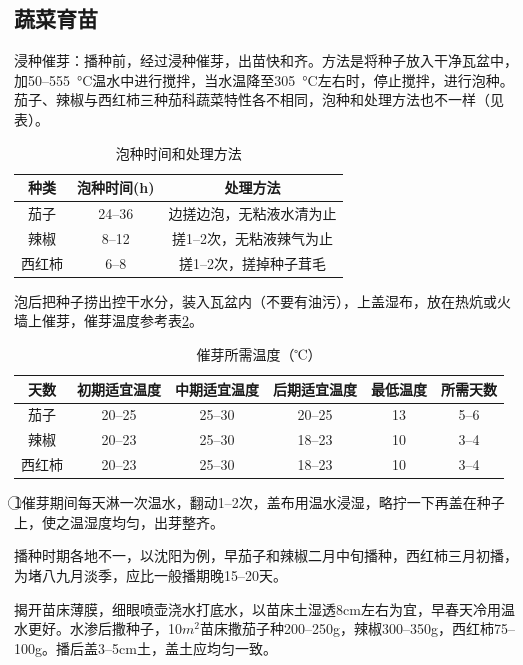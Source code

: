 \documentclass{ctexbook}
\begin{document}
\subsection{蔬菜育苗}
浸种催芽：播种前，经过浸种催芽，出苗快和齐。方法是将种子放入干净瓦盆中，加50--55\SI{5}{\degreeCelsius}温水中进行搅拌，当水温降至30\SI{5}{\degreeCelsius}左右时，停止搅拌，进行泡种。茄子、辣椒与西红柿三种茄科蔬菜特性各不相同，泡种和处理方法也不一样（见表）。
\begin{table}[htbp]
  \centering
  \caption{泡种时间和处理方法}
  \label{tab:11}
  \begin{tabular}{c|c|c}
    \hline
    种类 & 泡种时间(h) & 处理方法 \\  \hline
    茄子 & 24--36 & 边搓边泡，无粘液水清为止 \\ \hline
    辣椒 & 8--12 & 搓1--2次，无粘液辣气为止 \\ \hline
    西红柿 & 6--8 & 搓1--2次，搓掉种子茸毛 \\ \hline
  \end{tabular}
\end{table}
泡后把种子捞出控干水分，装入瓦盆内（不要有油污），上盖湿布，放在热炕或火墙上催芽，催芽温度参考表\ref{tab:cuiyawendu}。
\begin{table}[htbp]
	\centering
	\caption{催芽所需温度（℃）}
	\begin{tabular}{c|c|c|c|c|c}
		\hline
	天数	& 初期适宜温度   & 中期适宜温度   & 后期适宜温度   &    最低温度  & 所需天数 \\
		\hline
		茄子    & 20--25 & 25--30 & 20--25 & 13    & 5--6 \\ \hline
		辣椒    & 20--23 & 25--30 & 18--23 & 10    & 3--4 \\ \hline
		西红柿   & 20--23 & 25--30 & 18--23 & 10    & 3--4 \\ \hline
	\end{tabular}%
	\label{tab:cuiyawendu}%
\end{table}%
\textcircled{1}催芽期间每天淋一次温水，翻动1--2次，盖布用温水浸湿，略拧一下再盖在种子上，使之温湿度均匀，出芽整齐。

播种时期各地不一，以沈阳为例，早茄子和辣椒二月中旬播种，西红柿三月初播，为堵八九月淡季，应比一般播期晚15--20天。

揭开苗床薄膜，细眼喷壶浇水打底水，以苗床土湿透8cm左右为宜，早春天冷用温水更好。水渗后撒种子，10$m^{2}$苗床撒茄子种200--250g，辣椒300--350g，西红柿75--100g。播后盖3--5cm土，盖土应均匀一致。
\end{document}
